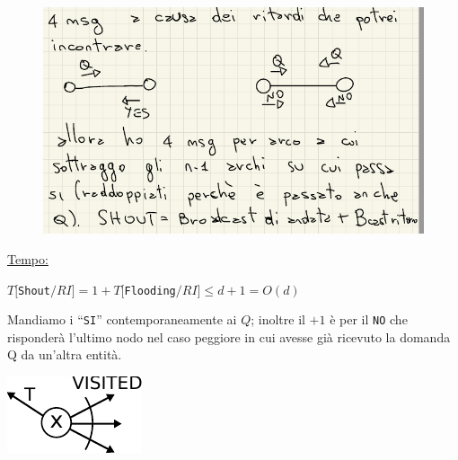 \begin{figure}[H]
    \centering
    \includegraphics[width=\linewidth, keepaspectratio]{aa/hh}
\end{figure}

\underline{Tempo:}
\begin{center}
    $T[$\texttt{Shout}$/RI] = 1 + T[$\texttt{Flooding}$/RI] \leq d + 1 = O(d)$
\end{center}
Mandiamo i ``\texttt{SI}'' contemporaneamente ai $Q$; inoltre il $+1$ è per il
\texttt{NO} che risponderà l'ultimo nodo nel caso peggiore in cui avesse già
ricevuto la domanda Q da un'altra entità.

\begin{center}
    \includegraphics[scale=1]{images/n_22}
\end{center}

